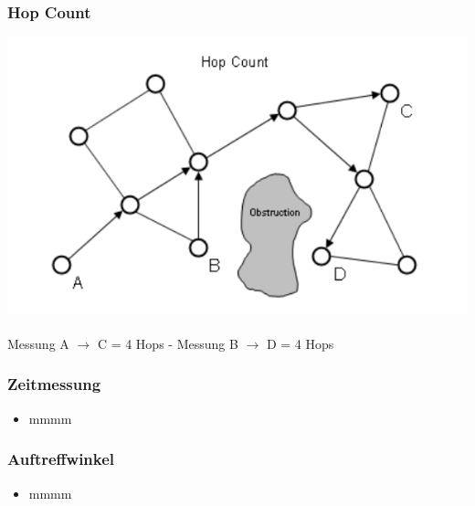\begin{frame}
  \frametitle{Hop Count}

  \begin{center}
  \includegraphics[scale=0.5]{img/hop_count1}
  \\~\\
  Messung A $\to$ C = 4 Hops - Messung B $\to$ D = 4 Hops
  \end{center}
\end{frame}

\begin{frame}
\frametitle{Zeitmessung}

\begin{itemize}
  \item mmmm
\end{itemize}
\end{frame}

\begin{frame}
\frametitle{Auftreffwinkel}

\begin{itemize}
  \item mmmm
\end{itemize}
\end{frame}
